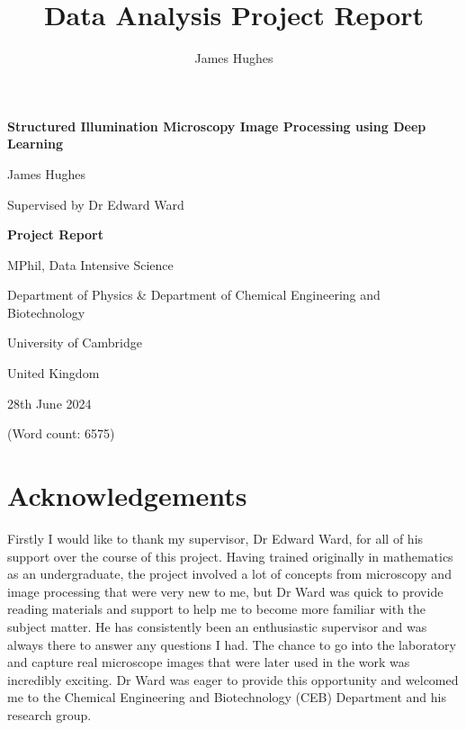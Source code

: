 \documentclass[12pt]{article}
\title{Data Analysis Project Report}
\author{James Hughes}
\begin{document}
\begin{titlepage}
    \begin{center}
        \vspace*{5cm}

        \Huge
        \textbf{Structured Illumination Microscopy Image Processing using Deep Learning}

        \vspace{0.5cm}
        \LARGE

        James Hughes

        Supervised by Dr Edward Ward

        \vspace{2cm}
        \Huge
        \textbf{Project Report}

        \vfill

        MPhil, Data Intensive Science

        \vspace{0.8cm}

        \Large
        Department of Physics \& Department of Chemical Engineering and Biotechnology

        University of Cambridge

        United Kingdom

        28th June 2024

        (Word count: 6575)

    \end{center}
\end{titlepage}


\newpage
\section*{Acknowledgements}

Firstly I would like to thank my supervisor, Dr Edward Ward, for all of his support over the course of this project.
Having trained originally in mathematics as an undergraduate,
the project involved a lot of concepts from microscopy and image processing that were very new to me,
but Dr Ward was quick to provide reading materials and support to help me to become more familiar with the subject matter.
He has consistently been an enthusiastic supervisor and was always there to answer any questions I had.
The chance to go into the laboratory and capture real microscope images that were later used in the work was incredibly exciting.
Dr Ward was eager to provide this opportunity and welcomed me to the Chemical Engineering and Biotechnology (CEB) Department and his research group.
\end{document}
